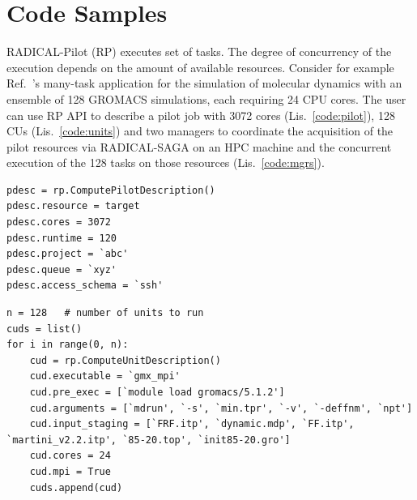 \documentclass[preprint,12pt, a4paper]{elsarticle}
\begin{document}
\section*{Code Samples}\label{sec:metadata}

RADICAL-Pilot (RP) executes set of tasks. The degree of concurrency of the
execution depends on the amount of available resources. Consider for example
Ref.~\cite{balasubramanian2016extasy}'s many-task application for the
simulation of molecular dynamics with an ensemble of 128 GROMACS simulations,
each requiring 24 CPU cores. The user can use RP API to describe a pilot job
with 3072 cores (Lis.~\ref{code:pilot}), 128 CUs (Lis.~\ref{code:units}) and
two managers to coordinate the acquisition of the pilot resources via
RADICAL-SAGA on an HPC machine and the concurrent execution of the 128 tasks
on those resources (Lis.~\ref{code:mgrs}).

\begin{lstlisting}
pdesc = rp.ComputePilotDescription()
pdesc.resource = target
pdesc.cores = 3072
pdesc.runtime = 120
pdesc.project = `abc'
pdesc.queue = `xyz'
pdesc.access_schema = `ssh'
\end{lstlisting}

\begin{lstlisting}
n = 128   # number of units to run
cuds = list()
for i in range(0, n):
    cud = rp.ComputeUnitDescription()
    cud.executable = `gmx_mpi'
    cud.pre_exec = [`module load gromacs/5.1.2']
    cud.arguments = [`mdrun', `-s', `min.tpr', `-v', `-deffnm', `npt']
    cud.input_staging = [`FRF.itp', `dynamic.mdp', `FF.itp', `martini_v2.2.itp', `85-20.top', `init85-20.gro']
    cud.cores = 24
    cud.mpi = True
    cuds.append(cud)
\end{lstlisting}
\end{document}

